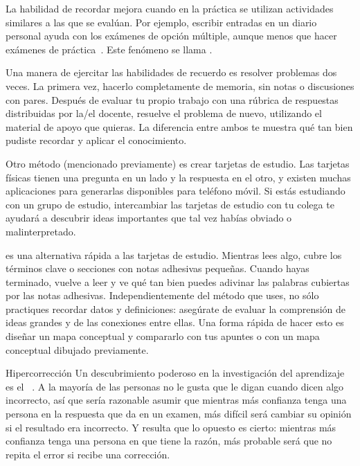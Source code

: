 La habilidad de recordar mejora cuando en la práctica se utilizan actividades similares a las que se evalúan.
Por ejemplo,
escribir entradas en un diario personal ayuda con los exámenes de opción múltiple,
aunque menos que hacer exámenes de práctica~\cite{Mill2016a}.
Este fenómeno se llama
.

Una manera de ejercitar las habilidades de recuerdo es resolver problemas dos veces.
La primera vez,
hacerlo completamente de memoria, sin notas o discusiones con pares.
Después de evaluar tu propio trabajo con una rúbrica de respuestas distribuidas por la/el docente,
resuelve el problema de nuevo, utilizando el material de apoyo que quieras.
La diferencia entre ambos te muestra qué tan bien pudiste recordar y aplicar el conocimiento.

Otro método (mencionado previamente) es crear tarjetas de estudio.
Las tarjetas físicas tienen una pregunta en un lado y la respuesta en el otro,
y existen muchas aplicaciones para generarlas disponibles para teléfono móvil.
Si estás estudiando con un grupo de estudio,
intercambiar las tarjetas de estudio con tu colega
te ayudará a descubrir ideas importantes que tal vez habías obviado o malinterpretado.

es una alternativa rápida a las tarjetas de estudio.
Mientras lees algo,
cubre los términos clave o secciones con notas adhesivas pequeñas.
Cuando hayas terminado,
vuelve a leer y ve qué tan bien puedes adivinar las palabras cubiertas por las notas adhesivas.
Independientemente del método que uses,
no sólo practiques recordar datos y definiciones:
asegúrate de evaluar la comprensión de ideas grandes
y de las conexiones entre ellas.
Una forma rápida de hacer esto es
diseñar un mapa conceptual y compararlo con tus apuntes
o con un mapa conceptual dibujado previamente.

\begin{aside}{Hipercorrección}
    Un descubrimiento poderoso en la investigación del aprendizaje es
  el ~\cite{Metc2016}.
  A la mayoría de las personas no le gusta que le digan cuando dicen algo incorrecto,
  así que sería razonable asumir que
  mientras más confianza tenga una persona en la respuesta que da en un examen,
  más difícil será cambiar su opinión si el resultado era incorrecto.
  Y resulta que lo opuesto es cierto:
  mientras más confianza tenga una persona en que tiene la razón,
  más probable será que no repita el error si recibe una corrección.
\end{aside}

